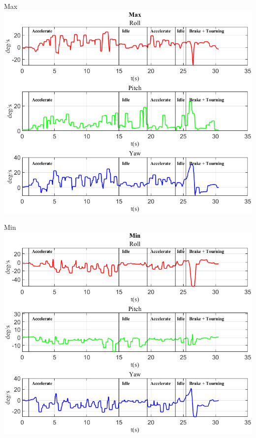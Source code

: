 \documentclass[beamer]{standalone}
\begin{document}
	\begin{frame}{{Max}}
		\centering\includegraphics[height=.8\textheight]{figure/VAng/Max}
	\end{frame}
	
	\begin{frame}{{Min}}
		\centering\includegraphics[height=.8\textheight]{figure/VAng/Min}
	\end{frame}
	
\end{document}
